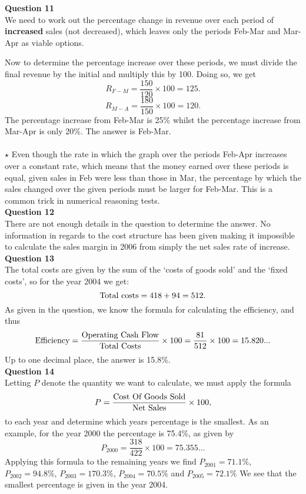 \documentclass{article}
\begin{document}
\textbf{Question 11} \\
We need to work out the percentage change in revenue over each period of \textbf{increased} sales (not decreased), which leaves only the periods Feb-Mar and Mar-Apr as viable options.

Now to determine the percentage increase over these periods, we must divide the final revenue by the initial and multiply this by 100. Doing so, we get
$$R_{F-M}=\frac{150}{120} \times 100 = 125.$$
$$R_{M-A}=\frac{180}{150} \times 100 = 120.$$
The percentage increase from Feb-Mar is 25\% whilst the percentage increase from Mar-Apr is only 20\%. The answer is Feb-Mar.\\
\\
$\star$ Even though the rate in which the graph over the periods Feb-Apr increases over a constant rate, which means that the money earned over these periods is equal, given sales in Feb were less than those in Mar, the percentage by which the sales changed over the given periods must be larger for Feb-Mar. This is a common trick in numerical reasoning tests.\\

\textbf{Question 12} \\
There are not enough details in the question to determine the answer. No information in regards to the cost structure has been given making it impossible to calculate the sales margin in 2006 from simply the net sales rate of increase.\\


\textbf{Question 13} \\
The total costs are given by the sum of the `costs of goods sold' and the `fixed costs', so for the year 2004 we get: 
$$\textnormal{Total costs} = 418+94=512.$$
As given in the question, we know the formula for calculating the efficiency, and thus
$$\textnormal{Efficiency} = \frac{\textnormal{Operating Cash Flow}}{\textnormal{Total Costs}} \times 100 = \frac{81}{512} \times 100 = 15.820...$$
Up to one decimal place, the answer is 15.8\%.\\

\textbf{Question 14} \\
Letting $P$ denote the quantity we want to calculate, we must apply the formula 
$$P=\frac{\textnormal{Cost Of Goods Sold}}{\textnormal{Net Sales}} \times 100,$$
to each year and determine which years percentage is the smallest.
As an example, for the year 2000 the percentage is 75.4\%, as given by
$$P_{2000}=\frac{318}{422} \times 100= 75.355...$$
Applying this formula to the remaining years we find $P_{2001}=71.1\%$, $P_{2002}=94.8\%$, $P_{2003}=170.3\%$, $P_{2004}=70.5\%$ and $P_{2005}=72.1\%$
We see that the smallest percentage is given in the year 2004.\\
\end{document}
